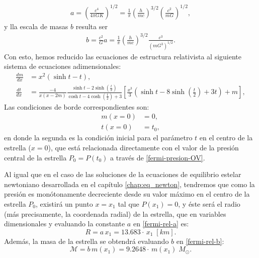 \begin{align}\label{fermi-rel-a}
 a=\left(\frac{c^4}{4\pi G K}\right)^{1/2}=\frac{1}{\pi}\left(\frac{h}{mc}\right)^{3/2}\left(\frac{c^2}{mG}\right)^{1/2},
\end{align}
y lla escala de masas $b$ resulta ser
\begin{align}\label{fermi-rel-b}
 b=\frac{c^2}{G}a=\frac{1}{\pi}\left(\frac{h}{mc}\right)^{3/2}\frac{c^3}{(mG^3)^{1/2}}.
\end{align}
Con esto, hemos reducido las ecuaciones de estructura relativista al siguiente sistema de ecuaciones adimensionales:
\begin{equation}\label{fermi-rel-sistema}
\boxed{
\begin{aligned}
\frac{dm}{dx}&=x^2(\sinh t-t),\\
\frac{dt}{dx}&=\frac{-4}{x(x-2m)}\frac{\sinh t-2\sinh\left(\frac{t}{2}\right)}{\cosh t-4\cosh \left(\frac{t}{2}\right)+3}\left[ \frac{x^3}{3}\left(\sinh t-8\sinh \left(\frac{t}{2}\right)+3t\right)+m\right],
\end{aligned}}
\end{equation}
Las condiciones de borde correspondientes son:
\begin{align}
 m(x=0)&=0,\\
t(x=0)&=t_0,
\end{align}
en donde la segunda es la condición inicial para el parámetro $t$ en el centro de la estrella ($x=0$), que está relacionada directamente con el valor de la presión central de la estrella $P_0=P(t_0)$ a través de \eqref{fermi-presion-OV}.

Al igual que en el caso de las soluciones de la ecuaciones de equilibrio estelar newtoniano desarrollada en el capítulo \ref{chap:eq_newton}, tendremos que como la presión es monótonamente decreciente desde su valor máximo en el centro de la estrella $P_0$, existirá un punto $x=x_1$ tal que $P(x_1)=0$, y éste será el radio (más precisamente, la coordenada radial) de la estrella, que en variables dimensionales y evaluando la constante $a$ en \eqref{fermi-rel-a} es:
\begin{equation}\label{fermi-rel-radio}
 R=a\, x_1
= 13.683\cdot\,x_1\;[km].
\end{equation}
Además, la masa de la estrella se obtendrá evaluando $b$ en \eqref{fermi-rel-b}:
\begin{equation}\label{fermi-rel-masa}
\mathcal{M}=b\,m(x_1)=9.2648\cdot\,m(x_1)\;M_{\odot}.
\end{equation}

